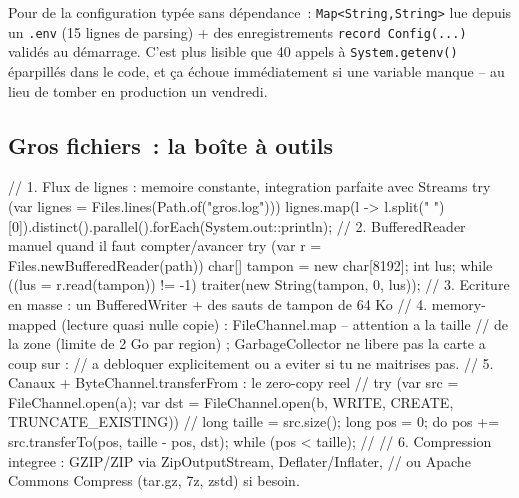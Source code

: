 \begin{astuce}
Pour de la configuration typ\'ee sans d\'ependance~: \verb|Map<String,String>| lue depuis un
\verb|.env| (15 lignes de parsing) + des enregistrements \verb|record Config(...) | valid\'es au
d\'emarrage. C'est plus lisible que 40 appels \`a \verb|System.getenv()| \'eparpill\'es dans le code, et
\c{c}a \'echoue imm\'ediatement si une variable manque -- au lieu de tomber en production un vendredi.
\end{astuce}

\subsection{Gros fichiers~: la bo\^ite \`a outils}

\begin{codejava}
// 1. Flux de lignes : memoire constante, integration parfaite avec Streams
try (var lignes = Files.lines(Path.of("gros.log"))) {
    lignes.map(l -> l.split(" ")[0]).distinct().parallel().forEach(System.out::println);
}
// 2. BufferedReader manuel quand il faut compter/avancer
try (var r = Files.newBufferedReader(path)) {
    char[] tampon = new char[8192];
    int lus;
    while ((lus = r.read(tampon)) != -1) { traiter(new String(tampon, 0, lus)); }
}
// 3. Ecriture en masse : un BufferedWriter + des sauts de tampon de 64 Ko
// 4. memory-mapped (lecture quasi nulle copie) : FileChannel.map -- attention a la taille
//    de la zone (limite de 2 Go par region) ; GarbageCollector ne libere pas la carte a coup sur :
//    a debloquer explicitement ou a eviter si tu ne maitrises pas.
// 5. Canaux + ByteChannel.transferFrom : le zero-copy reel
//    try (var src = FileChannel.open(a); var dst = FileChannel.open(b, WRITE, CREATE, TRUNCATE_EXISTING)) {
//        long taille = src.size(); long pos = 0; do { pos += src.transferTo(pos, taille - pos, dst); } while (pos < taille);
//    }
// 6. Compression integree : GZIP/ZIP via ZipOutputStream, Deflater/Inflater,
//    ou Apache Commons Compress (tar.gz, 7z, zstd) si besoin.
\end{codejava}

